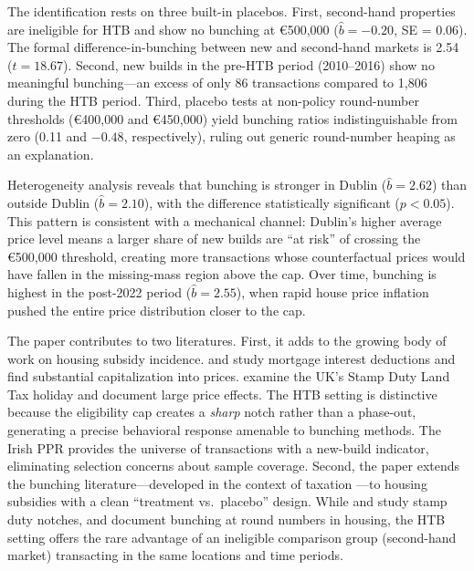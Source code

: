 \documentclass[12pt]{article}
\newcommand{\eur}[1]{\euro{}#1}
\begin{document}
The identification rests on three built-in placebos. First, second-hand properties are ineligible for HTB and show no bunching at \eur{500,000} ($\hat{b} = -0.20$, SE = 0.06). The formal difference-in-bunching between new and second-hand markets is 2.54 ($t = 18.67$). Second, new builds in the pre-HTB period (2010--2016) show no meaningful bunching---an excess of only 86 transactions compared to 1,806 during the HTB period. Third, placebo tests at non-policy round-number thresholds (\eur{400,000} and \eur{450,000}) yield bunching ratios indistinguishable from zero (0.11 and $-0.48$, respectively), ruling out generic round-number heaping as an explanation.

Heterogeneity analysis reveals that bunching is stronger in Dublin ($\hat{b} = 2.62$) than outside Dublin ($\hat{b} = 2.10$), with the difference statistically significant ($p < 0.05$). This pattern is consistent with a mechanical channel: Dublin's higher average price level means a larger share of new builds are ``at risk'' of crossing the \eur{500,000} threshold, creating more transactions whose counterfactual prices would have fallen in the missing-mass region above the cap. Over time, bunching is highest in the post-2022 period ($\hat{b} = 2.55$), when rapid house price inflation pushed the entire price distribution closer to the cap.

The paper contributes to two literatures. First, it adds to the growing body of work on housing subsidy incidence. \citet{dachis2012mortgage} and \citet{hilber2016mortgage} study mortgage interest deductions and find substantial capitalization into prices. \citet{best2023housing} examine the UK's Stamp Duty Land Tax holiday and document large price effects. The HTB setting is distinctive because the eligibility cap creates a \textit{sharp} notch rather than a phase-out, generating a precise behavioral response amenable to bunching methods. The Irish PPR provides the universe of transactions with a new-build indicator, eliminating selection concerns about sample coverage. Second, the paper extends the bunching literature---developed in the context of taxation \citep{saez2010bunching,chetty2011adjustment,kleven2013using}---to housing subsidies with a clean ``treatment vs.\ placebo'' design. While \citet{best2023housing} and \citet{besley2014stamp} study stamp duty notches, and \citet{kopczuk2016property} document bunching at round numbers in housing, the HTB setting offers the rare advantage of an ineligible comparison group (second-hand market) transacting in the same locations and time periods.
\end{document}
